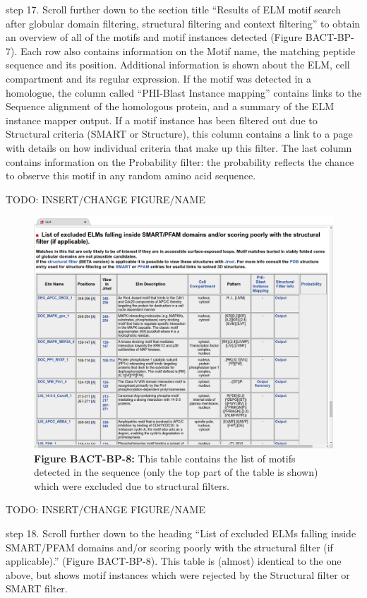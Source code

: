 step 17. Scroll further down to the section title ``Results of ELM motif
search after globular domain filtering, structural filtering and context
filtering'' to obtain an overview of all of the motifs and motif
instances detected (Figure BACT-BP-7). Each row also contains
information on the Motif name, the matching peptide sequence and its
position. Additional information is shown about the ELM, cell
compartment and its regular expression. If the motif was detected in a
homologue, the column called ``PHI-Blast Instance mapping'' contains
links to the Sequence alignment of the homologous protein, and a summary
of the ELM instance mapper output. If a motif instance has been filtered
out due to Structural criteria (SMART or Structure), this column
contains a link to a page with details on how individual criteria that
make up this filter. The last column contains information on the
Probability filter: the probability reflects the chance to observe this
motif in any random amino acid sequence.

TODO: INSERT/CHANGE FIGURE/NAME

\begin{figure}[h!]
\centering
\includegraphics[width=\textwidth]{Figures/TP53_1/elm_results_motifs_filtered.png}
\caption{
\textbf{Figure BACT-BP-8:} This table contains the list of motifs
detected in the sequence (only the top part of the table is shown) which
were excluded due to structural filters.
}
\end{figure}

TODO: INSERT/CHANGE FIGURE/NAME

step 18. Scroll further down to the heading ``List of excluded ELMs
falling inside SMART/PFAM domains and/or scoring poorly with the
structural filter (if applicable).'' (Figure BACT-BP-8). This table is
(almost) identical to the one above, but shows motif instances which
were rejected by the Structural filter or SMART filter.

